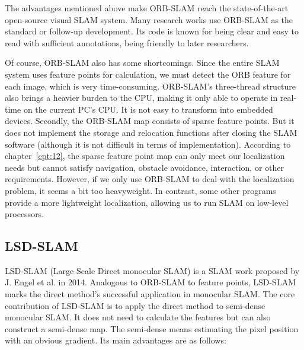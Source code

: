 The advantages mentioned above make ORB-SLAM reach the state-of-the-art open-source visual SLAM system. Many research works use ORB-SLAM as the standard or follow-up development. Its code is known for being clear and easy to read with sufficient annotations, being friendly to later researchers. 

Of course, ORB-SLAM also has some shortcomings. Since the entire SLAM system uses feature points for calculation, we must detect the ORB feature for each image, which is very time-consuming. ORB-SLAM's three-thread structure also brings a heavier burden to the CPU, making it only able to operate in real-time on the current PC's CPU. It is not easy to transform into embedded devices. Secondly, the ORB-SLAM map consists of sparse feature points. But it does not implement the storage and relocation functions after closing the SLAM software (although it is not difficult in terms of implementation). According to chapter~\ref{cpt:12}, the sparse feature point map can only meet our localization needs but cannot satisfy navigation, obstacle avoidance, interaction, or other requirements. However, if we only use ORB-SLAM to deal with the localization problem, it seems a bit too heavyweight. In contrast, some other programs provide a more lightweight localization, allowing us to run SLAM on low-level processors.

\subsection{LSD-SLAM}
LSD-SLAM (Large Scale Direct monocular SLAM) is a SLAM work {\cite{Engel2013, Engel2014}} proposed by J. Engel et al. in 2014. Analogous to ORB-SLAM to feature points, LSD-SLAM marks the direct method's successful application in monocular SLAM. The core contribution of LSD-SLAM is to apply the direct method to semi-dense monocular SLAM. It does not need to calculate the features but can also construct a semi-dense map. The semi-dense means estimating the pixel position with an obvious gradient. Its main advantages are as follows:

